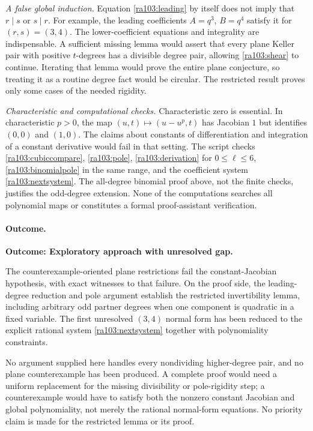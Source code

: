 \documentclass[11pt]{article}
\begin{document}
\emph{A false global induction.}
Equation \eqref{ra103:leading} by itself does not imply that $r\mid s$ or
$s\mid r$. For example, the leading coefficients $A=q^3$, $B=q^4$
satisfy it for $(r,s)=(3,4)$. The lower-coefficient equations and integrality
are indispensable. A sufficient missing lemma would assert that every plane
Keller pair with positive $t$-degrees has a divisible degree pair, allowing
\eqref{ra103:shear} to continue. Iterating that lemma would prove the entire
plane conjecture, so treating it as a routine degree fact would be circular.
The restricted result proves only some cases of the needed rigidity.

\emph{Characteristic and computational checks.}
Characteristic zero is essential. In characteristic $p>0$, the map
$(u,t)\mapsto(u-u^p,t)$ has Jacobian $1$ but identifies $(0,0)$ and $(1,0)$.
The claims about constants of differentiation and integration of a constant
derivative would fail in that setting. The script checks
\eqref{ra103:cubiccompare}, \eqref{ra103:pole},
\eqref{ra103:derivation} for $0\le\ell\le6$,
\eqref{ra103:binomialpole} in the same range, and the coefficient system
\eqref{ra103:nextsystem}. The all-degree binomial proof above, not the finite
checks, justifies the odd-degree extension. None of the computations searches
all polynomial maps or constitutes a formal proof-assistant verification.

\paragraph{Outcome.}
\textbf{Outcome: Exploratory approach with unresolved gap.}

The counterexample-oriented plane restrictions fail the constant-Jacobian
hypothesis, with exact witnesses to that failure. On the proof side, the
leading-degree reduction and pole argument establish the restricted
invertibility lemma, including arbitrary odd partner degrees when one
component is quadratic in a fixed variable. The first unresolved $(3,4)$
normal form has been reduced to the explicit rational system
\eqref{ra103:nextsystem} together with polynomiality constraints.

No argument supplied here handles every nondividing higher-degree pair, and
no plane counterexample has been produced. A complete proof would need a
uniform replacement for the missing divisibility or pole-rigidity step; a
counterexample would have to satisfy both the nonzero constant Jacobian and
global polynomiality, not merely the rational normal-form equations. No
priority claim is made for the restricted lemma or its proof.
\end{document}

